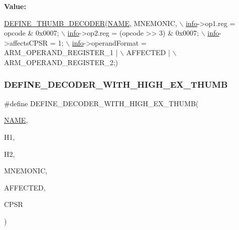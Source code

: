 {\bfseries Value\+:}
\begin{DoxyCode}
\mbox{\hyperlink{decoder-thumb_8c_a44d34ec3fd7c2c2ee51ff5966678c86e}{DEFINE\_THUMB\_DECODER}}(\mbox{\hyperlink{inflate_8h_a164ea0159d5f0b5f12a646f25f99eceaa67bc2ced260a8e43805d2480a785d312}{NAME}}, MNEMONIC, \(\backslash\)
        \mbox{\hyperlink{libretro_8h_structretro__game__info}{info}}->op1.reg = opcode & 0x0007; \(\backslash\)
        \mbox{\hyperlink{libretro_8h_structretro__game__info}{info}}->op2.reg = (opcode >> 3) & 0x0007; \(\backslash\)
        \mbox{\hyperlink{libretro_8h_structretro__game__info}{info}}->affectsCPSR = 1; \(\backslash\)
        \mbox{\hyperlink{libretro_8h_structretro__game__info}{info}}->operandFormat = ARM\_OPERAND\_REGISTER\_1 | \(\backslash\)
            AFFECTED | \(\backslash\)
            ARM\_OPERAND\_REGISTER\_2;)
\end{DoxyCode}
\mbox{\label{decoder-thumb_8c_a77b4e7b16f8500ba7de60167582fb945}} 
\subsubsection{\texorpdfstring{D\+E\+F\+I\+N\+E\+\_\+\+D\+E\+C\+O\+D\+E\+R\+\_\+\+W\+I\+T\+H\+\_\+\+H\+I\+G\+H\+\_\+\+E\+X\+\_\+\+T\+H\+U\+MB}{DEFINE\_DECODER\_WITH\_HIGH\_EX\_THUMB}}
{\footnotesize\ttfamily \#define D\+E\+F\+I\+N\+E\+\_\+\+D\+E\+C\+O\+D\+E\+R\+\_\+\+W\+I\+T\+H\+\_\+\+H\+I\+G\+H\+\_\+\+E\+X\+\_\+\+T\+H\+U\+MB(\begin{DoxyParamCaption}\item[{}]{\mbox{\hyperlink{inflate_8h_a164ea0159d5f0b5f12a646f25f99eceaa67bc2ced260a8e43805d2480a785d312}{N\+A\+ME}},  }\item[{}]{H1,  }\item[{}]{H2,  }\item[{}]{M\+N\+E\+M\+O\+N\+IC,  }\item[{}]{A\+F\+F\+E\+C\+T\+ED,  }\item[{}]{C\+P\+SR }\end{DoxyParamCaption})}

